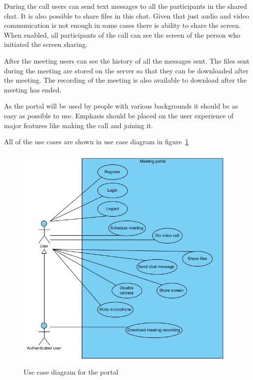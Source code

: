 \documentclass[
  digital, %
  table,   %
  lof,     %
  nolot,     %
]{fithesis3}
\begin{document}
During the call users can send text messages to all the participants in the shared chat. It is also possible to share files in this chat. Given that just audio and video communication is not enough in some cases there is ability to share the screen. When enabled, all participants of the call can see the screen of the person who initiated the screen sharing. 

After the meeting users can see the history of all the messages sent. The files sent during the meeting are stored on the server so that they can be downloaded after the meeting. The recording of the meeting is also available to download after the meeting has ended.

As the portal will be used by people with various backgrounds it should be as easy as possible to use. Emphasis should be placed on the user experience of major features like making the call and joining it.

All of the use cases are shown in use case diagram in figure~\ref{fig:useCase}

\begin{figure}
  \begin{center}
    \includegraphics[scale=0.7]{diagrams/use_case.png}
  \end{center}
  \caption{Use case diagram for the portal}
  \label{fig:useCase}
\end{figure}
\end{document}
